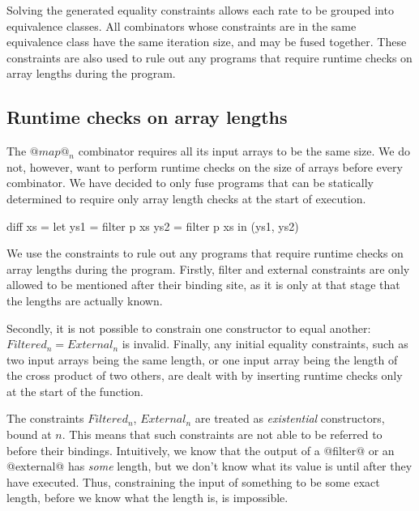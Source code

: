 Solving the generated equality constraints allows each rate to be grouped into equivalence classes.
All combinators whose constraints are in the same equivalence class have the same iteration size, and may be fused together.
These constraints are also used to rule out any programs that require runtime checks on array lengths during the program.

\subsection{Runtime checks on array lengths}
The $@map@_n$ combinator requires all its input arrays to be the same size.
We do not, however, want to perform runtime checks on the size of arrays before every combinator.
We have decided to only fuse programs that can be statically determined to require only array length checks at the start of execution. 

\begin{code}
 diff xs = let ys1 = filter p xs
               ys2 = filter p xs
           in  (ys1, ys2)
\end{code}




We use the constraints to rule out any programs that require runtime checks on array lengths during the program. Firstly, filter and external constraints are only allowed to be mentioned after their binding site, as it is only at that stage that the lengths are actually known.


Secondly, it is not possible to constrain one constructor to equal another: $Filtered_n = External_n$ is invalid. Finally, any initial equality constraints, such as two input arrays being the same length, or one input array being the length of the cross product of two others, are dealt with by inserting runtime checks only at the start of the function.


The constraints $Filtered_n$, $External_n$ are treated as \emph{existential} constructors, bound at $n$. This means that such constraints are not able to be referred to before their bindings.
Intuitively, we know that the output of a @filter@ or an @external@ has \emph{some} length, but we don't know what its value is until after they have executed. Thus, constraining the input of something to be some exact length, before we know what the length is, is impossible.

